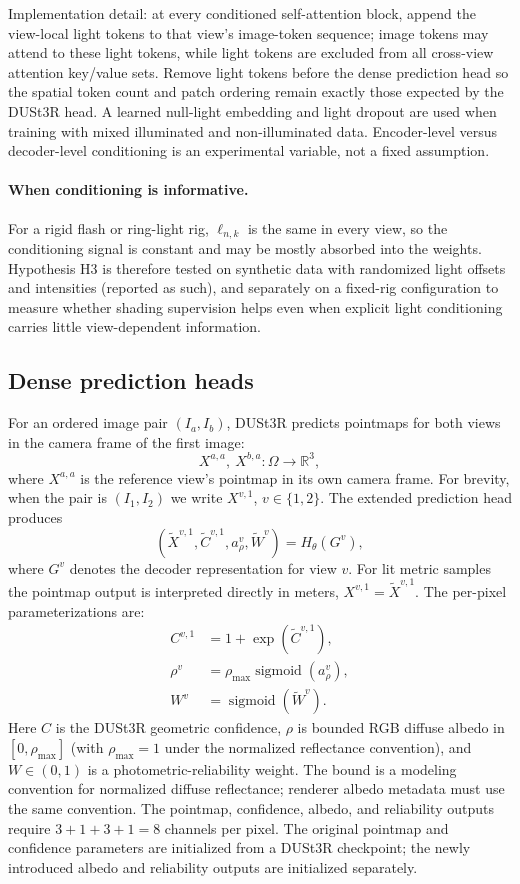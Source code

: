 \documentclass[11pt,a4paper]{article}
\newcommand{\R}{\mathbb{R}}
\newcommand{\sigmoid}{\operatorname{sigmoid}}
\begin{document}
Implementation detail: at every conditioned self-attention block, append
the view-local light tokens to that view's image-token sequence; image tokens
may attend to these light tokens, while light tokens are excluded from all
cross-view attention key/value sets. Remove light tokens before the dense
prediction head so the spatial token count and patch ordering remain exactly
those expected by the DUSt3R head. A learned null-light embedding and light
dropout are used when training with mixed illuminated and non-illuminated
data. Encoder-level versus
decoder-level conditioning is an experimental variable, not a fixed
assumption.

\paragraph{When conditioning is informative.}
For a rigid flash or ring-light rig, $\bm\ell_{n,k}$ is the same in every
view, so the conditioning signal is constant and may be mostly absorbed into
the weights. Hypothesis H3 is therefore tested on synthetic data with
randomized light offsets and intensities (reported as such), and separately
on a fixed-rig configuration to measure whether shading supervision helps
even when explicit light conditioning carries little view-dependent information.

\subsection{Dense prediction heads}

For an ordered image pair $(I_a,I_b)$, DUSt3R predicts pointmaps for both views in
the camera frame of the first image:
\[
  X^{a,a},\ X^{b,a}:\Omega\rightarrow\R^3,
\]
where $X^{a,a}$ is the reference view's pointmap in its own camera frame.
For brevity, when the pair is $(I_1,I_2)$ we write $X^{v,1}$, $v\in\{1,2\}$.
The extended prediction head produces
\[
  \left(
    \widetilde X^{v,1},
    \widetilde C^{v,1},
    a_\rho^v,
    \widetilde W^v
  \right)
  =
  H_\theta(G^v),
\]
where $G^v$ denotes the decoder representation for view $v$. For lit
metric samples the pointmap output is interpreted directly in meters,
$X^{v,1}=\widetilde X^{v,1}$. The per-pixel parameterizations are:
\begin{align}
  C^{v,1} &= 1+\exp(\widetilde C^{v,1}),\\
  \rho^v &= \rho_{\max}\sigmoid(a_\rho^v),\\
  W^v &= \sigmoid(\widetilde W^v).
\end{align}
Here $C$ is the DUSt3R geometric confidence, $\rho$ is bounded RGB
diffuse albedo in $[0,\rho_{\max}]$ (with $\rho_{\max}=1$ under
the normalized reflectance convention), and $W\in(0,1)$ is a
photometric-reliability weight. The bound is a modeling convention for
normalized diffuse reflectance; renderer albedo metadata must use the same
convention.
The pointmap, confidence, albedo, and reliability outputs require
$3+1+3+1=8$ channels per pixel.
The original pointmap and confidence
parameters are initialized from a DUSt3R checkpoint; the newly introduced
albedo and reliability outputs are initialized separately.
\end{document}
